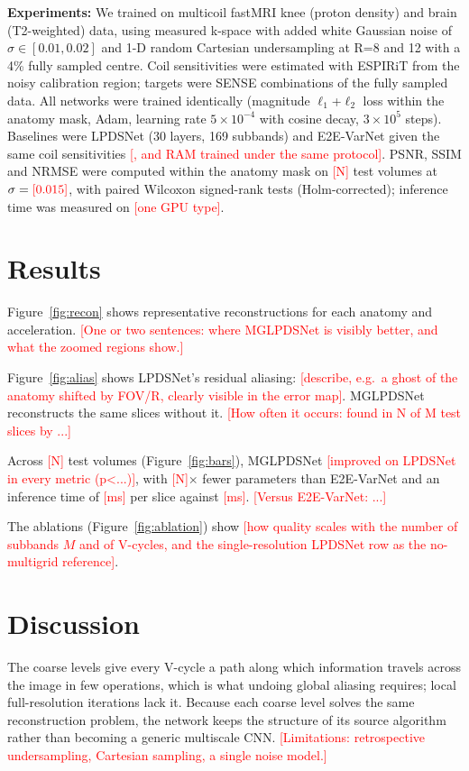 \documentclass[10pt]{article}
\newcommand{\todo}[1]{\textcolor{red}{[#1]}}
\begin{document}
\textbf{Experiments:} We trained on multicoil fastMRI\cite{ref_fastmri} knee (proton density) and
brain (T2-weighted) data, using measured k-space with added white Gaussian noise of
$\sigma\in[0.01,0.02]$ and 1-D random Cartesian undersampling at R=8 and 12 with a 4\% fully
sampled centre. Coil sensitivities were estimated with ESPIRiT from the noisy calibration region;
targets were SENSE combinations of the fully sampled data. All networks were trained identically
(magnitude $\ell_1$+$\ell_2$ loss within the anatomy mask, Adam, learning rate $5\times10^{-4}$
with cosine decay, $3\times10^5$ steps). Baselines were LPDSNet\cite{ref_lpdsnet} (30 layers,
169 subbands) and E2E-VarNet\cite{ref_varnet} given the same coil sensitivities
\todo{, and RAM\cite{ref_ram} trained under the same protocol}. PSNR, SSIM and NRMSE were computed
within the anatomy mask on \todo{N} test volumes at $\sigma=\todo{0.015}$, with paired Wilcoxon
signed-rank tests (Holm-corrected); inference time was measured on \todo{one GPU type}.

\section*{Results}
Figure~\ref{fig:recon} shows representative reconstructions for each anatomy and acceleration.
\todo{One or two sentences: where MGLPDSNet is visibly better, and what the zoomed regions show.}

Figure~\ref{fig:alias} shows LPDSNet's residual aliasing: \todo{describe, e.g.\ a ghost of the
anatomy shifted by FOV/R, clearly visible in the error map}. MGLPDSNet reconstructs the same slices
without it. \todo{How often it occurs: found in N of M test slices by ...}

Across \todo{N} test volumes (Figure~\ref{fig:bars}), MGLPDSNet \todo{improved on LPDSNet in every
metric (p<...)}, with \todo{N}$\times$ fewer parameters than E2E-VarNet and an inference time of
\todo{ms} per slice against \todo{ms}. \todo{Versus E2E-VarNet: ...}

The ablations (Figure~\ref{fig:ablation}) show \todo{how quality scales with the number of
subbands $M$ and of V-cycles, and the single-resolution LPDSNet row as the no-multigrid reference}.

\section*{Discussion}
The coarse levels give every V-cycle a path along which information travels across the image in
few operations, which is what undoing global aliasing requires; local full-resolution iterations
lack it. Because each coarse level solves the same reconstruction problem, the network keeps the
structure of its source algorithm rather than becoming a generic multiscale CNN.
\todo{Limitations: retrospective undersampling, Cartesian sampling, a single noise model.}
\end{document}
